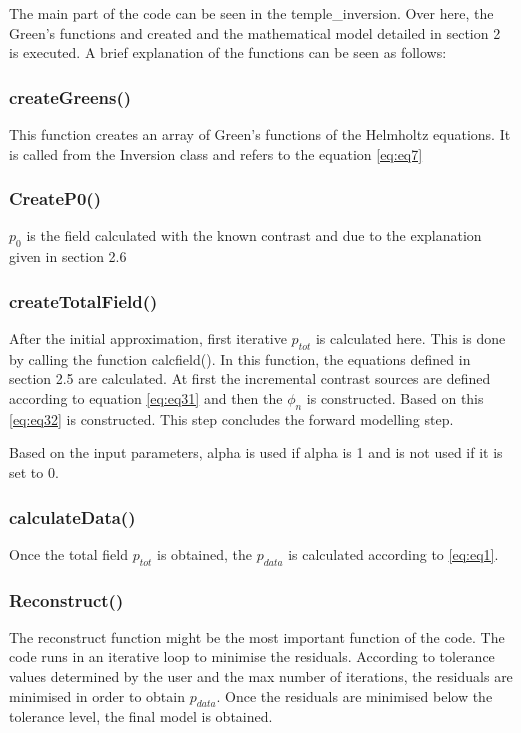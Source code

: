 \documentclass[10pt,a4paper]{article}
\begin{document}
The main part of the code can be seen in the temple\_inversion. Over here, the Green's functions and created and the mathematical model detailed in section 2 is executed. A brief explanation of the functions can be seen as follows:
 
\subsubsection{createGreens()}

This function creates an array of Green's functions of the  Helmholtz equations. It is called from the Inversion class and refers to the equation \ref{eq:eq7}

\subsubsection{CreateP0()}
$p_0$ is the field calculated with the known contrast and due to the explanation given in section 2.6

\subsubsection{createTotalField()}

After the initial approximation, first iterative $p_{tot}$ is calculated here. This is done by calling the function calcfield(). In this function, the equations defined in section 2.5 are calculated. At first the incremental contrast sources are defined according to equation \ref{eq:eq31} and then the $\phi_n$ is constructed. Based on this \ref{eq:eq32} is constructed. This step concludes the forward modelling step.
\newline

Based on the input parameters, alpha is used if alpha is 1 and is not used if it is set to 0.

\subsubsection{calculateData()}
Once the total field $p_{tot}$ is obtained, the $p_{data}$ is calculated according to \ref{eq:eq1}. 

\subsubsection{Reconstruct()}
The reconstruct function might be the most important function of the code. The code runs in an iterative loop to minimise the residuals. According to tolerance values determined by the user and the max number of iterations, the residuals are minimised in order to obtain $p_{data}$. Once the residuals are minimised below the tolerance level, the final model is obtained.
\newline
\end{document}
